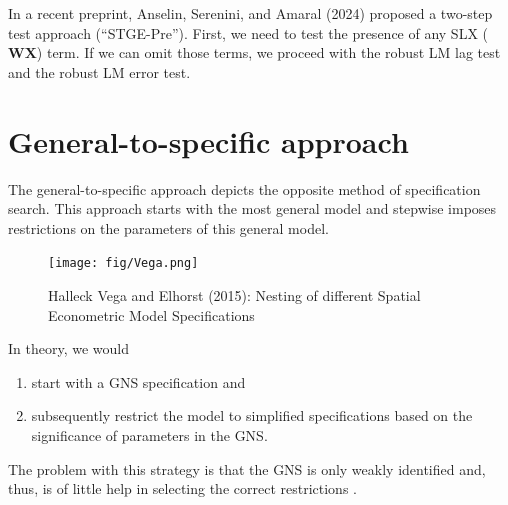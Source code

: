 \documentclass[
  letterpaper,
  DIV=11,
  numbers=noendperiod]{scrreprt}
\begin{document}
\begin{tcolorbox}[enhanced jigsaw, opacitybacktitle=0.6, left=2mm, leftrule=.75mm, toptitle=1mm, breakable, colback=white, bottomrule=.15mm, colframe=quarto-callout-tip-color-frame, colbacktitle=quarto-callout-tip-color!10!white, coltitle=black, bottomtitle=1mm, titlerule=0mm, title=\textcolor{quarto-callout-tip-color}{\faLightbulb}\hspace{0.5em}{Potential solution?}, opacityback=0, arc=.35mm, rightrule=.15mm, toprule=.15mm]

In a recent preprint, Anselin, Serenini, and Amaral (2024) proposed a
two-step test approach (``STGE-Pre''). First, we need to test the
presence of any SLX
(\(\boldsymbol{\mathbf{W}} \boldsymbol{\mathbf{X}}\)) term. If we can
omit those terms, we proceed with the robust LM lag test and the robust
LM error test.

\end{tcolorbox}

\hypertarget{general-to-specific-approach}{%
\section{General-to-specific
approach}\label{general-to-specific-approach}}

The general-to-specific approach depicts the opposite method of
specification search. This approach starts with the most general model
and stepwise imposes restrictions on the parameters of this general
model.

\begin{figure}

{\centering \texttt{[image: fig/Vega.png]}

}

\caption{Halleck Vega and Elhorst (2015): Nesting of different Spatial
Econometric Model Specifications}

\end{figure}

In theory, we would

\begin{enumerate}
\def\labelenumi{\arabic{enumi})}
\item
  start with a GNS specification and
\item
  subsequently restrict the model to simplified specifications based on
  the significance of parameters in the GNS.
\end{enumerate}

The problem with this strategy is that the GNS is only weakly identified
and, thus, is of little help in selecting the correct restrictions
\citep{Burridge.2016}.
\end{document}
